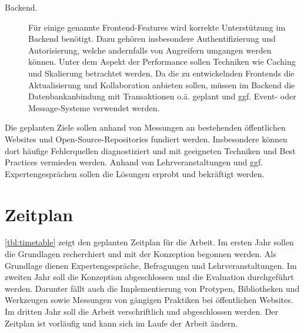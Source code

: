 \begin{description}
    \item[Backend.] Für einige genannte Frontend-Features wird korrekte Unterstützung im Backend benötigt.
    Dazu gehören insbesondere Authentifizierung und Autorisierung, welche andernfalls von Angreifern umgangen werden können.
    Unter dem Aspekt der Performance sollen Techniken wie Caching und Skalierung betrachtet werden.
    Da die zu entwickelnden Frontends die Aktualisierung und Kollaboration anbieten sollen, müssen im Backend die Datenbankanbindung mit Transaktionen o.ä. geplant und ggf. Event- oder Message-Systeme verwendet werden.
\end{description}

Die geplanten Ziele sollen anhand von Messungen an bestehenden öffentlichen Websites und Open-Source-Repositories fundiert werden.
Insbesondere können dort häufige Fehlerquellen diagnostiziert und mit geeigneten Techniken und Best Practices vermieden werden.
Anhand von Lehrveranstaltungen und ggf. Expertengesprächen sollen die Lösungen erprobt und bekräftigt werden.

\section{Zeitplan}\label{sec:zeitplan}

\autoref{tbl:timetable} zeigt den geplanten Zeitplan für die Arbeit.
Im ersten Jahr sollen die Grundlagen recherchiert und mit der Konzeption begonnen werden.
Als Grundlage dienen Expertengespräche, Befragungen und Lehrveranstaltungen.
Im zweiten Jahr soll die Konzeption abgeschlossen und die Evaluation durchgeführt werden.
Darunter fällt auch die Implementierung von Protypen, Bibliotheken und Werkzeugen sowie Messungen von gängigen Praktiken bei öffentlichen Websites.
Im dritten Jahr soll die Arbeit verschriftlich und abgeschlossen werden.
Der Zeitplan ist vorläufig und kann sich im Laufe der Arbeit ändern.

